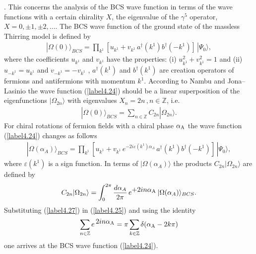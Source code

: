 \documentclass[a4paper,12pt] {article}
\begin{document}
\cite{Na60}. This concerns the analysis of the BCS wave function in
terms of the wave functions with a certain chirality $X$, the
eigenvalue of the $\gamma^5$ operator, $X = 0,\pm 1,\pm 2,\ldots $. The
BCS wave function of the ground state of the massless Thirring model
is defined by \cite{th0105057,th0210104}
%
\begin{eqnarray}\label{label4.24}
|\Omega(0)\rangle_{BCS} = \prod_{k^1}[u_{k^1} +
 v_{k^1}\,a^{\dagger}(k^1)b^{\dagger}(-k^1)]\,|\Psi_0\rangle,
\end{eqnarray}
%
where the coefficients $u_{k^1}$ and $v_{k^1}$ have the properties:
(i) $u^2_{k^1} + v^2_{k^1} = 1$ and (ii) $u_{- k^1} = u_{k^1}$ and
$v_{-k^1} = - v_{k^1}$ \cite{th0105057,th0210104}, $a^{\dagger}(k^1)$
and $b^{\dagger}(k^1)$ are creation operators of fermions and
antifermions with momentum $k^1$. According to Nambu and Jona--Lasinio
\cite{Na60} the wave function (\ref{label4.24}) should be a linear
superposition of the eigenfunctions $|\Omega_{2n}\rangle$ with
eigenvalues $X_n = 2n\,, n\in {\mathbb{Z}}$, i.e.
%
\begin{eqnarray}\label{label4.25}
|\Omega(0)\rangle_{BCS} =\sum_{n \in
 \mathbb{Z}}C_{2n}|\Omega_{2n}\rangle.
\end{eqnarray}
%
For chiral rotations of fermion fields with a chiral phase $\alpha_{\rm
A}$ the wave function (\ref{label4.24}) changes as follows
\cite{th0105057}
%
\begin{eqnarray}\label{label4.26}
|\Omega(\alpha_{A})\rangle_{BCS} = \prod_{k^1}[u_{k^1} +
 v_{k^1}\,e^{\textstyle -2i\varepsilon(k^1)\alpha_{A}}\,
 a^{\dagger}(k^1)b^{\dagger}(-k^1)]\,|\Psi_0\rangle,
\end{eqnarray}
%
where $\varepsilon(k^1)$ is a sign function. In terms of
$|\Omega(\alpha_{A})\rangle$ the products $C_{2n} |\Omega_{2n}
\rangle$ are defined by
%
\begin{eqnarray}\label{label4.27}
C_{2n}|\Omega_{2n}\rangle =
 \int^{2\pi}_0\frac{d\alpha_{A}}{2\pi}\,e^{\textstyle +2in\alpha_{\rm
 A}}\,|\Omega(\alpha_{A})\rangle_{BCS}.
\end{eqnarray}
%
Substituting (\ref{label4.27}) in (\ref{label4.25}) and using the
identity \cite{IG64}
%
\begin{eqnarray}\label{label4.28}
\sum_{n\in \mathbb{Z}}e^{\textstyle\,2in\alpha_{\rm A}} =
\pi\sum_{k\in \mathbb{Z}}\delta(\alpha_{\rm A} - 2k\pi)
\end{eqnarray}
%
one arrives at the BCS wave function (\ref{label4.24}).
 
\end{document}
